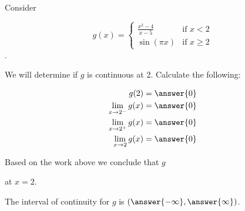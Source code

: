 \documentclass{ximera}
\author{Nela Lakos \and Kyle Parsons}
\begin{document}
\begin{exercise}

Consider

\[
g(x) = 
\begin{cases}
\frac{x^2-4}{x-5} & \text{if }x<2\\
\sin(\pi x) & \text{if }x\geq2
\end{cases}
\].

We will determine if $g$ is continuous at 2.  Calculate the following:

\begin{align*}
g(2) &= \answer{0}\\
\lim_{x\to2^-}g(x) &= \answer{0}\\
\lim_{x\to2^+}g(x) &= \answer{0}\\
\lim_{x\to2}g(x) &= \answer{0}
\end{align*}

\begin{exercise}

Based on the work above we conclude that $g$
\begin{multipleChoice}
\end{multipleChoice}
at $x=2$.

\begin{exercise}

The interval of continuity for $g$ is $\left(\answer{-\infty},\answer{\infty}\right)$.

\end{exercise}
\end{exercise}
\end{exercise}
\end{document}
